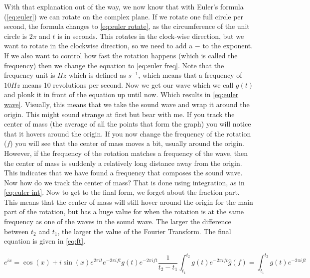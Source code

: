 With that explanation out of the way, we now know that with Euler's formula (\autoref{eq:euler}) we can rotate on the complex plane. If we rotate one full circle per second, the formula changes 
to \autoref{eq:euler rotate}, as the circumference of the unit circle is $2\pi$ and $t$ is in seconds. This rotates in the clock-wise direction, but we want to rotate in the clockwise direction, 
so we need to add a $-$ to the exponent. If we also want to control how fast the rotation happens (which is called the frequency) then we change the equation to \autoref{eq:euler freq}. Note that
the frequency unit is $Hz$ which is defined as $s^{-1}$, which means that a frequency of $10 Hz$ means 10 revolutions per second. Now we get our wave which we call $g(t)$ and plonk it in front 
of the equation up until now. Which results in \autoref{eq:euler wave}. Visually, this means that we take the sound wave and wrap it around the origin. This might sound strange at first but bear 
with me. If you track the center of mass (the average of all the points that form the graph) you will notice that it hovers around the origin. If you now change the frequency of the rotation ($f$)
you will see that the center of mass moves a bit, usually around the origin. However, if the frequency of the rotation matches a frequency of the wave, then the center of mass is suddenly a 
relatively long distance away from the origin. This indicates that we have found a frequency that composes the sound wave. Now how do we track the center of mass? That is done using integration,
as in \autoref{eq:euler int}. Now to get to the final form, we forget about the fraction part. This means that the center of mass will still hover around the origin for the main part of the 
rotation, but has a huge value for when the rotation is at the same frequency as one of the waves in the sound wave. The larger the difference between $t_2$ and $t_1$, the larger the value of the
Fourier Transform. The final equation is given in \autoref{eq:ft}.

\begin{subequations}
    \begin{equation}
        e^{ix} = \cos(x) + i\sin(x)
        \label{eq:euler}
    \end{equation}
    \begin{equation}
        e^{2\pi it}
        \label{eq:euler rotate}
    \end{equation}
    \begin{equation}
        e^{-2\pi ift}
        \label{eq:euler freq}
    \end{equation}
    \begin{equation}
        g(t)e^{-2\pi ift}
        \label{eq:euler wave}
    \end{equation}
    \begin{equation}
        \frac{1}{t_2 - t_1}\int^{t_2}_{t_1}g(t)e^{-2\pi ift}
        \label{eq:euler int}
    \end{equation}
    \begin{equation}
        \hat{g}(f) = \int^{t_2}_{t_1}g(t)e^{-2\pi ift}
        \label{eq:ft}
    \end{equation}
\end{subequations}

